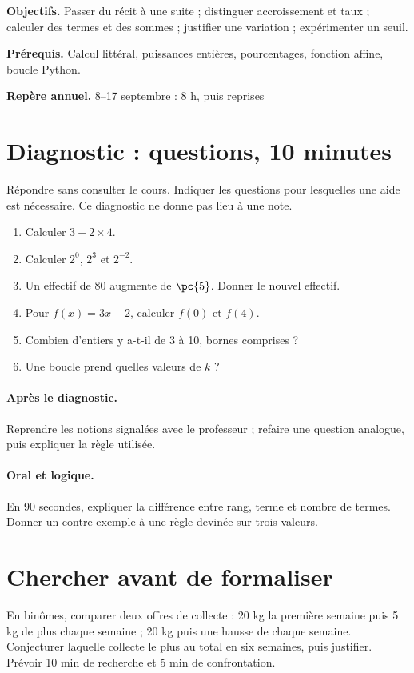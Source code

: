 \label{C01}
\begin{keypoint}
\textbf{Objectifs.} Passer du récit à une suite ; distinguer accroissement et taux ; calculer des termes et des sommes ; justifier une variation ; expérimenter un seuil.

\textbf{Prérequis.} Calcul littéral, puissances entières, pourcentages, fonction affine, boucle Python.

\textbf{Repère annuel.} 8–17 septembre : 8 h, puis reprises\end{keypoint}
\section*{Diagnostic :  questions, 10 minutes}\label{C01-D}
Répondre sans consulter le cours. Indiquer les questions pour lesquelles une aide est nécessaire. Ce diagnostic ne donne pas lieu à une note.
\begin{enumerate}
\item Calculer $3+2\times4$.
\item Calculer $2^0$, $2^3$ et $2^{-2}$.
\item Un effectif de 80 augmente de $\pc{5}$. Donner le nouvel effectif.
\item Pour $f(x)=3x-2$, calculer $f(0)$ et $f(4)$.
\item Combien d’entiers y a-t-il de 3 à 10, bornes comprises ?
\item Une boucle  prend quelles valeurs de $k$ ?
\end{enumerate}
\paragraph{Après le diagnostic.} Reprendre les notions signalées avec le professeur ; refaire une question analogue, puis expliquer la règle utilisée.
\paragraph{Oral et logique.} En 90 secondes, expliquer la différence entre rang, terme et nombre de termes. Donner un contre-exemple à une règle devinée sur trois valeurs.
\mxnewpage
\section*{Chercher avant de formaliser}\label{C01-RECH}
En binômes, comparer deux offres de collecte : 20 kg la première semaine puis 5 kg de plus chaque semaine ; 20 kg puis une hausse de  chaque semaine. Conjecturer laquelle collecte le plus au total en six semaines, puis justifier. Prévoir 10 min de recherche et 5 min de confrontation.
